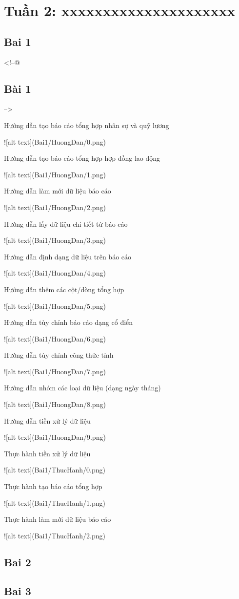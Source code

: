 \documentclass{article}
\begin{document}
\tableofcontents
\newpage
\listoffigures
\newpage
\section{Tuần 2: xxxxxxxxxxxxxxxxxxxxx}

\subsection{Bai 1}
<!--@ \subsection{Bài 1} -->

\caption{Hướng dẫn tạo báo cáo tổng hợp nhân sự và quỹ lương}
![alt text](Bai1/HuongDan/0.png)
\caption{Hướng dẫn tạo báo cáo tổng hợp hợp đồng lao động}
![alt text](Bai1/HuongDan/1.png)
\caption{Hướng dẫn làm mới dữ liệu báo cáo}
![alt text](Bai1/HuongDan/2.png)
\caption{Hướng dẫn lấy dữ liệu chi tiết từ báo cáo}
![alt text](Bai1/HuongDan/3.png)
\caption{Hướng dẫn định dạng dữ liệu trên báo cáo}
![alt text](Bai1/HuongDan/4.png)
\caption{Hướng dẫn thêm các cột/dòng tổng hợp}
![alt text](Bai1/HuongDan/5.png)
\caption{Hướng dẫn tùy chỉnh báo cáo dạng cổ điển}
![alt text](Bai1/HuongDan/6.png)
\caption{Hướng dẫn tùy chỉnh công thức tính}
![alt text](Bai1/HuongDan/7.png)
\caption{Hướng dẫn nhóm các loại dữ liệu (dạng ngày tháng)}
![alt text](Bai1/HuongDan/8.png)
\caption{Hướng dẫn tiền xử lý dữ liệu}
![alt text](Bai1/HuongDan/9.png)

\caption{Thực hành tiền xử lý dữ liệu}
![alt text](Bai1/ThucHanh/0.png)
\caption{Thực hành tạo báo cáo tổng hợp}
![alt text](Bai1/ThucHanh/1.png)
\caption{Thực hành làm mới dữ liệu báo cáo}
![alt text](Bai1/ThucHanh/2.png)
\subsection{Bai 2}

\subsection{Bai 3}

\end{document}
